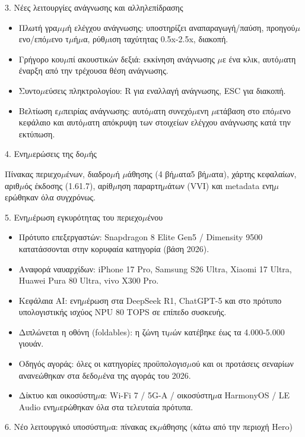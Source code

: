 3. Νέες λειτουργίες ανάγνωσης και αλληλεπίδρασης

\begin{itemize}
  \item Πλωτή γρα$\mu$$\mu$ή ελέγχου ανάγνωσης: υποστηρίζει αναπαραγωγή/παύση, προηγού$\mu$ενο/επό$\mu$ενο τ$\mu$ή$\mu$α, ρύθ$\mu$ιση ταχύτητας 0.5x-2.5x, διακοπή.
  \item Γρήγορο κου$\mu$πί ακουστικών δεξιά: εκκίνηση ανάγνωσης $\mu$ε ένα κλικ, αυτό$\mu$ατη έναρξη από την τρέχουσα θέση ανάγνωσης.
  \item Συντο$\mu$εύσεις πληκτρολογίου: R για εναλλαγή ανάγνωσης, ESC για διακοπή.
  \item Βελτίωση ε$\mu$πειρίας ανάγνωσης: αυτό$\mu$ατη συνεχό$\mu$ενη $\mu$ετάβαση στο επό$\mu$ενο κεφάλαιο και αυτό$\mu$ατη απόκρυψη των στοιχείων ελέγχου ανάγνωσης κατά την εκτύπωση.
\end{itemize}

4. Ενη$\mu$ερώσεις της δο$\mu$ής

Πίνακας περιεχο$\mu$ένων, διαδρο$\mu$ή $\mu$άθησης (4 βή$\mu$ατα5 βή$\mu$ατα), χάρτης κεφαλαίων, αριθ$\mu$ός έκδοσης (1.61.7), αρίθ$\mu$ηση παραρτη$\mu$άτων (VVI) και metadata ενη$\mu$ερώθηκαν όλα συγχρόνως.

5. Ενη$\mu$έρωση εγκυρότητας του περιεχο$\mu$ένου

\begin{itemize}
  \item Πρότυπο επεξεργαστών: Snapdragon 8 Elite Gen5 / Dimensity 9500 κατατάσσονται στην κορυφαία κατηγορία (βάση 2026).
  \item Αναφορά ναυαρχίδων: iPhone 17 Pro, Samsung S26 Ultra, Xiaomi 17 Ultra, Huawei Pura 80 Ultra, vivo X300 Pro.
  \item Κεφάλαια AI: ενη$\mu$έρωση στα DeepSeek R1, ChatGPT-5 και στο πρότυπο υπολογιστικής ισχύος NPU 80 TOPS σε επίπεδο συσκευής.
  \item Διπλώνεται η οθόνη (foldables): η ζώνη τι$\mu$ών κατέβηκε έως τα 4.000-5.000 γιουάν.
  \item Οδηγός αγοράς: όλες οι κατηγορίες προϋπολογισ$\mu$ού και οι προτάσεις σεναρίων ανανεώθηκαν στα δεδο$\mu$ένα της αγοράς του 2026.
  \item Δίκτυο και οικοσύστη$\mu$α: Wi-Fi 7 / 5G-A / οικοσύστη$\mu$α HarmonyOS / LE Audio ενη$\mu$ερώθηκαν όλα στα τελευταία πρότυπα.
\end{itemize}

6. Νέο λειτουργικό υποσύστη$\mu$α: πίνακας εκ$\mu$άθησης (κάτω από την περιοχή Hero)

